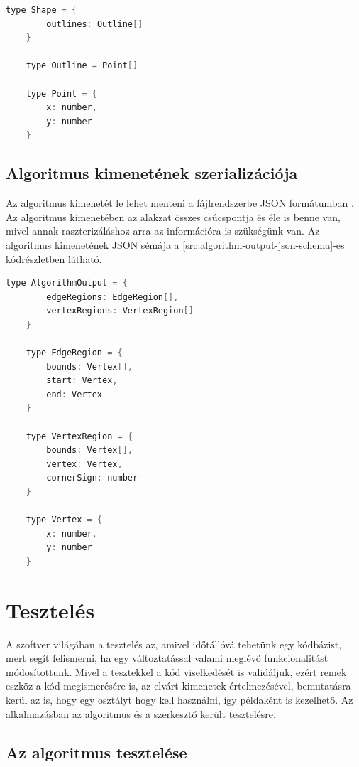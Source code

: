 \begin{lstlisting}[language=C]
	type Shape = {
		outlines: Outline[]
	}
	
	type Outline = Point[]
	
	type Point = {
		x: number,
		y: number
	}
\end{lstlisting}


\subsection{Algoritmus kimenetének szerializációja}
Az algoritmus kimenetét le lehet menteni a fájlrendszerbe JSON formátumban \cite{json}. Az algoritmus kimenetében az alakzat összes csúcspontja és éle is benne van, mivel annak raszterizáláshoz arra az információra is szükségünk van. Az algoritmus kimenetének JSON sémája a \ref{src:algorithm-output-json-schema}-es kódrészletben látható.

\begin{lstlisting}[language=C]
	type AlgorithmOutput = {
		edgeRegions: EdgeRegion[],
		vertexRegions: VertexRegion[]
	}
	
	type EdgeRegion = {
		bounds: Vertex[],
		start: Vertex,
		end: Vertex
	}
	
	type VertexRegion = {
		bounds: Vertex[],
		vertex: Vertex,
		cornerSign: number
	}
	
	type Vertex = {
		x: number,
		y: number
	}
\end{lstlisting}


\section{Tesztelés}

A szoftver világában a tesztelés az, amivel időtállóvá tehetünk egy kódbázist, mert segít felismerni, ha egy változtatással valami meglévő funkcionalitást módosítottunk. Mivel a tesztekkel a kód viselkedését is validáljuk, ezért remek eszköz a kód megismerésére is, az elvárt kimenetek értelmezésével, bemutatásra kerül az is, hogy egy osztályt hogy kell használni, így példaként is kezelhető.
Az alkalmazásban az algoritmus és a szerkesztő került tesztelésre.

\subsection{Az algoritmus tesztelése}

